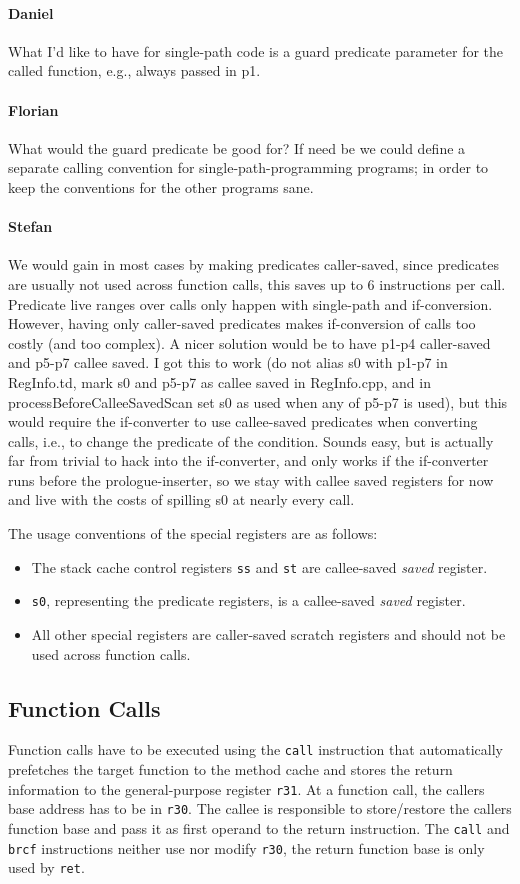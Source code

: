 \documentclass{IEEEtran}
\newcommand{\comment}[3]{\paragraph*{\textbf{#1}}{\color{#3}#2}}
\newcommand{\stefan}[1]{\comment{Stefan}{#1}{RoyalPurple}}
\newcommand{\daniel}[1]{\comment{Daniel}{#1}{RoyalBlue}}
\newcommand{\fb}[1]{\comment{Florian}{#1}{Emerald}}
\begin{document}
\daniel{
What I'd like to have for single-path code is a guard predicate parameter for the called function, e.g., always passed in p1.
}
\fb{What would the guard predicate be good for? If need be we could define a
separate calling convention for single-path-programming programs; in order to
keep the conventions for the other programs sane.}

\stefan{We would gain in most cases by making predicates caller-saved, since predicates are usually not 
used across function calls, this saves up to 6 instructions per call. 
Predicate live ranges over calls only happen with single-path and if-conversion. However, having only caller-saved predicates
makes if-conversion of calls too costly (and too complex). A nicer solution would be to have p1-p4 caller-saved and
p5-p7 callee saved. I got this to work (do not alias s0 with p1-p7 in RegInfo.td, mark s0 and p5-p7 as callee saved 
in RegInfo.cpp, and in processBeforeCalleeSavedScan set s0 as used when any of p5-p7 is used), but this would require the
if-converter to use callee-saved predicates when converting calls, i.e., to change the predicate of the condition.
Sounds easy, but is actually far from trivial to hack into the if-converter, and only works if the if-converter runs before the
prologue-inserter, so we stay with callee saved registers for now and live with the costs of spilling s0 at nearly every call.}


The usage conventions of the special registers are as follows:
\begin{itemize}
  \item The stack cache control registers \texttt{ss} and \texttt{st} are callee-saved
        \emph{saved} register.
  \item \texttt{s0}, representing the predicate registers, is a callee-saved \emph{saved} register.
  \item All other special registers are caller-saved scratch registers and should not be used
        across function calls.
\end{itemize}

\subsection{Function Calls}
\label{sec:function_calls}

Function calls have to be executed using the \texttt{call}
instruction that automatically prefetches the target function to the method
cache and stores the return information to the general-purpose register \texttt{r31}.
At a function call, the callers base address has to be in \texttt{r30}.
The callee is responsible to store/restore the callers function base and pass it as first
operand to the return instruction. 
The \texttt{call} and \texttt{brcf} instructions neither use nor modify \texttt{r30}, the
return function base is only used by \texttt{ret}.
\end{document}
